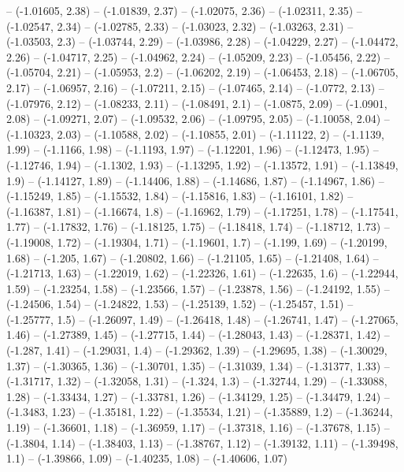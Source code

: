 -- (-1.01605, 2.38)
-- (-1.01839, 2.37)
-- (-1.02075, 2.36)
-- (-1.02311, 2.35)
-- (-1.02547, 2.34)
-- (-1.02785, 2.33)
-- (-1.03023, 2.32)
-- (-1.03263, 2.31)
-- (-1.03503, 2.3)
-- (-1.03744, 2.29)
-- (-1.03986, 2.28)
-- (-1.04229, 2.27)
-- (-1.04472, 2.26)
-- (-1.04717, 2.25)
-- (-1.04962, 2.24)
-- (-1.05209, 2.23)
-- (-1.05456, 2.22)
-- (-1.05704, 2.21)
-- (-1.05953, 2.2)
-- (-1.06202, 2.19)
-- (-1.06453, 2.18)
-- (-1.06705, 2.17)
-- (-1.06957, 2.16)
-- (-1.07211, 2.15)
-- (-1.07465, 2.14)
-- (-1.0772, 2.13)
-- (-1.07976, 2.12)
-- (-1.08233, 2.11)
-- (-1.08491, 2.1)
-- (-1.0875, 2.09)
-- (-1.0901, 2.08)
-- (-1.09271, 2.07)
-- (-1.09532, 2.06)
-- (-1.09795, 2.05)
-- (-1.10058, 2.04)
-- (-1.10323, 2.03)
-- (-1.10588, 2.02)
-- (-1.10855, 2.01)
-- (-1.11122, 2)
-- (-1.1139, 1.99)
-- (-1.1166, 1.98)
-- (-1.1193, 1.97)
-- (-1.12201, 1.96)
-- (-1.12473, 1.95)
-- (-1.12746, 1.94)
-- (-1.1302, 1.93)
-- (-1.13295, 1.92)
-- (-1.13572, 1.91)
-- (-1.13849, 1.9)
-- (-1.14127, 1.89)
-- (-1.14406, 1.88)
-- (-1.14686, 1.87)
-- (-1.14967, 1.86)
-- (-1.15249, 1.85)
-- (-1.15532, 1.84)
-- (-1.15816, 1.83)
-- (-1.16101, 1.82)
-- (-1.16387, 1.81)
-- (-1.16674, 1.8)
-- (-1.16962, 1.79)
-- (-1.17251, 1.78)
-- (-1.17541, 1.77)
-- (-1.17832, 1.76)
-- (-1.18125, 1.75)
-- (-1.18418, 1.74)
-- (-1.18712, 1.73)
-- (-1.19008, 1.72)
-- (-1.19304, 1.71)
-- (-1.19601, 1.7)
-- (-1.199, 1.69)
-- (-1.20199, 1.68)
-- (-1.205, 1.67)
-- (-1.20802, 1.66)
-- (-1.21105, 1.65)
-- (-1.21408, 1.64)
-- (-1.21713, 1.63)
-- (-1.22019, 1.62)
-- (-1.22326, 1.61)
-- (-1.22635, 1.6)
-- (-1.22944, 1.59)
-- (-1.23254, 1.58)
-- (-1.23566, 1.57)
-- (-1.23878, 1.56)
-- (-1.24192, 1.55)
-- (-1.24506, 1.54)
-- (-1.24822, 1.53)
-- (-1.25139, 1.52)
-- (-1.25457, 1.51)
-- (-1.25777, 1.5)
-- (-1.26097, 1.49)
-- (-1.26418, 1.48)
-- (-1.26741, 1.47)
-- (-1.27065, 1.46)
-- (-1.27389, 1.45)
-- (-1.27715, 1.44)
-- (-1.28043, 1.43)
-- (-1.28371, 1.42)
-- (-1.287, 1.41)
-- (-1.29031, 1.4)
-- (-1.29362, 1.39)
-- (-1.29695, 1.38)
-- (-1.30029, 1.37)
-- (-1.30365, 1.36)
-- (-1.30701, 1.35)
-- (-1.31039, 1.34)
-- (-1.31377, 1.33)
-- (-1.31717, 1.32)
-- (-1.32058, 1.31)
-- (-1.324, 1.3)
-- (-1.32744, 1.29)
-- (-1.33088, 1.28)
-- (-1.33434, 1.27)
-- (-1.33781, 1.26)
-- (-1.34129, 1.25)
-- (-1.34479, 1.24)
-- (-1.3483, 1.23)
-- (-1.35181, 1.22)
-- (-1.35534, 1.21)
-- (-1.35889, 1.2)
-- (-1.36244, 1.19)
-- (-1.36601, 1.18)
-- (-1.36959, 1.17)
-- (-1.37318, 1.16)
-- (-1.37678, 1.15)
-- (-1.3804, 1.14)
-- (-1.38403, 1.13)
-- (-1.38767, 1.12)
-- (-1.39132, 1.11)
-- (-1.39498, 1.1)
-- (-1.39866, 1.09)
-- (-1.40235, 1.08)
-- (-1.40606, 1.07)
